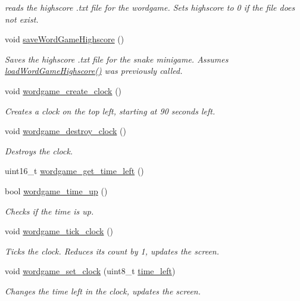 \begin{DoxyCompactItemize}
\begin{DoxyCompactList}\small\item\em reads the highscore .txt file for the wordgame. Sets highscore to 0 if the file does not exist. \end{DoxyCompactList}\item 
void \mbox{\hyperlink{group__wordpicker_gaaa45a5f1ebd34efbf6b74088634083bc}{save\+Word\+Game\+Highscore}} ()
\begin{DoxyCompactList}\small\item\em Saves the highscore .txt file for the snake minigame. Assumes \mbox{\hyperlink{group__wordpicker_gab63191abcd00066c036c0b26e148651a}{load\+Word\+Game\+Highscore()}} was previously called. \end{DoxyCompactList}\item 
void \mbox{\hyperlink{group__wordpicker_ga2ecc68e66d169550aae1f9b6e6548297}{wordgame\+\_\+create\+\_\+clock}} ()
\begin{DoxyCompactList}\small\item\em Creates a clock on the top left, starting at 90 seconds left. \end{DoxyCompactList}\item 
void \mbox{\hyperlink{group__wordpicker_gac613632e3bb4704baaa134a857bb30c2}{wordgame\+\_\+destroy\+\_\+clock}} ()
\begin{DoxyCompactList}\small\item\em Destroys the clock. \end{DoxyCompactList}\item 
uint16\+\_\+t \mbox{\hyperlink{group__wordpicker_ga331045a68738d98e1553c33ea143720b}{wordgame\+\_\+get\+\_\+time\+\_\+left}} ()
\item 
bool \mbox{\hyperlink{group__wordpicker_ga9ec7ee484cb29f6d473530e913fe02f9}{wordgame\+\_\+time\+\_\+up}} ()
\begin{DoxyCompactList}\small\item\em Checks if the time is up. \end{DoxyCompactList}\item 
void \mbox{\hyperlink{group__wordpicker_gac2b5613b65b81d59f2265c357fd5cdae}{wordgame\+\_\+tick\+\_\+clock}} ()
\begin{DoxyCompactList}\small\item\em Ticks the clock. Reduces its count by 1, updates the screen. \end{DoxyCompactList}\item 
void \mbox{\hyperlink{group__wordpicker_ga7984076dba84531d5c4e5e96ca7b177d}{wordgame\+\_\+set\+\_\+clock}} (uint8\+\_\+t \mbox{\hyperlink{wordpicker_8c_aad18a277e8cd8821dc805d23b6a70a75}{time\+\_\+left}})
\begin{DoxyCompactList}\small\item\em Changes the time left in the clock, updates the screen. \end{DoxyCompactList}\end{DoxyCompactItemize}


